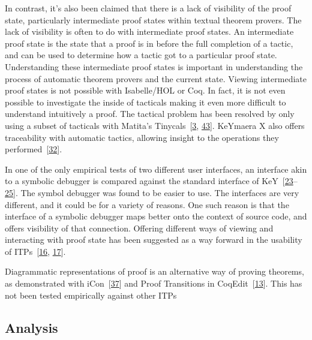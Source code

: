 \documentclass[
]{article}
\begin{document}
In contrast, it's also been claimed that there is a lack of visibility
of the proof state, particularly intermediate proof states within
textual theorem provers. The lack of visibility is often to do with
intermediate proof states. An intermediate proof state is the state that
a proof is in before the full completion of a tactic, and can be used to
determine how a tactic got to a particular proof state. Understanding
these intermediate proof states is important in understanding the
process of automatic theorem provers and the current state. Viewing
intermediate proof states is not possible with Isabelle/HOL or Coq. In
fact, it is not even possible to investigate the inside of tacticals
making it even more difficult to understand intuitively a proof. The
tactical problem has been resolved by only using a subset of tacticals
with Matita's Tinycals~{[}\protect\hyperlink{ref-asperti_user_2007}{3},
\protect\hyperlink{ref-zacchiroli_user_2007}{43}{]}. KeYmaera X also
offers traceability with automatic tactics, allowing insight to the
operations they
performed~{[}\protect\hyperlink{ref-mitsch_keymaera_2017}{32}{]}.

In one of the only empirical tests of two different user interfaces, an
interface akin to a symbolic debugger is compared against the standard
interface of
KeY~{[}\protect\hyperlink{ref-hentschel_empirical_2016}{23}--\protect\hyperlink{ref-hentschel_interactive_2016}{25}{]}.
The symbol debugger was found to be easier to use. The interfaces are
very different, and it could be for a variety of reasons. One such
reason is that the interface of a symbolic debugger maps better onto the
context of source code, and offers visibility of that connection.
Offering different ways of viewing and interacting with proof state has
been suggested as a way forward in the usability of
ITPs~{[}\protect\hyperlink{ref-eastaughffe_support_1998}{16},
\protect\hyperlink{ref-grebing_seamless_2020}{17}{]}.

Diagrammatic representations of proof is an alternative way of proving
theorems, as demonstrated with
iCon~{[}\protect\hyperlink{ref-shams_accessible_2018}{37}{]} and Proof
Transitions in
CoqEdit~{[}\protect\hyperlink{ref-berman_development_2014}{13}{]}. This
has not been tested empirically against other ITPs

\hypertarget{analysis}{%
\subsection{Analysis}\label{analysis}}
\end{document}
